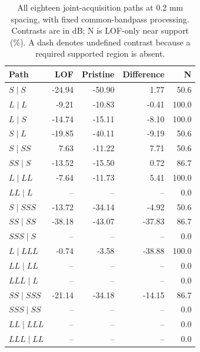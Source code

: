 \documentclass[11pt]{article}
\begin{document}
\begin{table}[htbp]\centering\small
\caption{All eighteen joint-acquisition paths at 0.2 mm spacing, with fixed common-bandpass processing. Contrasts are in dB; N is LOF-only near support (\%). A dash denotes undefined contrast because a required supported region is absent.}
\label{saft:archive:partial:joint_paths}
\begin{tabular}{@{}lrrrr@{}}\toprule
Path & LOF & Pristine & Difference & N\\\midrule
$S\mid S$ & -24.94 & -50.90 & 1.77 & 50.6 \\
$L\mid L$ & -9.21 & -10.83 & -0.41 & 100.0 \\
$L\mid S$ & -14.74 & -15.11 & -8.10 & 100.0 \\
$S\mid L$ & -19.85 & -40.11 & -9.19 & 50.6 \\
$S\mid SS$ & 7.63 & -11.22 & 7.71 & 50.6 \\
$SS\mid S$ & -13.52 & -15.50 & 0.72 & 86.7 \\
$L\mid LL$ & -7.64 & -11.73 & 5.41 & 100.0 \\
$LL\mid L$ & -- & -- & -- & 0.0 \\
$S\mid SSS$ & -13.72 & -34.14 & -4.92 & 50.6 \\
$SS\mid SS$ & -38.18 & -43.07 & -37.83 & 86.7 \\
$SSS\mid S$ & -- & -- & -- & 0.0 \\
$L\mid LLL$ & -0.74 & -3.58 & -38.88 & 100.0 \\
$LL\mid LL$ & -- & -- & -- & 0.0 \\
$LLL\mid L$ & -- & -- & -- & 0.0 \\
$SS\mid SSS$ & -21.14 & -34.18 & -14.15 & 86.7 \\
$SSS\mid SS$ & -- & -- & -- & 0.0 \\
$LL\mid LLL$ & -- & -- & -- & 0.0 \\
$LLL\mid LL$ & -- & -- & -- & 0.0 \\

\bottomrule\end{tabular}
\end{table}
\end{document}
